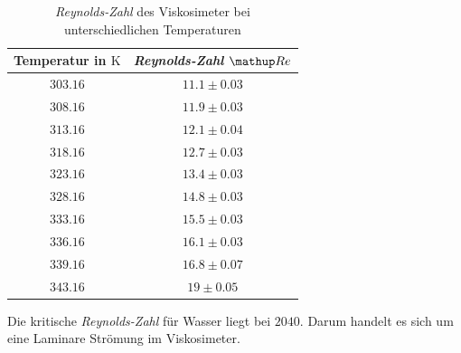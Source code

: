 \begin{table}
\centering
\begin{tabular} {cc}
  \toprule
  Temperatur in $\si{\kelvin}$ & \emph{Reynolds-Zahl} $\map{Re}$ \\
  \midrule 
  $\num{303.16}$ & $\num{11.1}\pm \num{0.03}$ \\
  $\num{308.16}$ & $\num{11.9}\pm \num{0.03}$ \\
  $\num{313.16}$ & $\num{12.1}\pm \num{0.04}$ \\ 
  $\num{318.16}$ & $\num{12.7}\pm \num{0.03}$ \\
  $\num{323.16}$ & $\num{13.4}\pm \num{0.03}$ \\ 
  $\num{328.16}$ & $\num{14.8}\pm \num{0.03}$ \\ 
  $\num{333.16}$ & $\num{15.5}\pm \num{0.03}$ \\ 
  $\num{336.16}$ & $\num{16.1}\pm \num{0.03}$ \\
  $\num{339.16}$ & $\num{16.8}\pm \num{0.07}$ \\
  $\num{343.16}$ & $\num{19}\pm \num{0.05}$ \\
\bottomrule
\end{tabular}
\caption{\emph{Reynolds-Zahl} des Viskosimeter bei unterschiedlichen Temperaturen}
\label{tab:rey_visko}
\end{table}
Die kritische \emph{Reynolds-Zahl} für Wasser liegt bei $2040$\cite{rey}.
Darum handelt es sich um eine Laminare Strömung im Viskosimeter.
